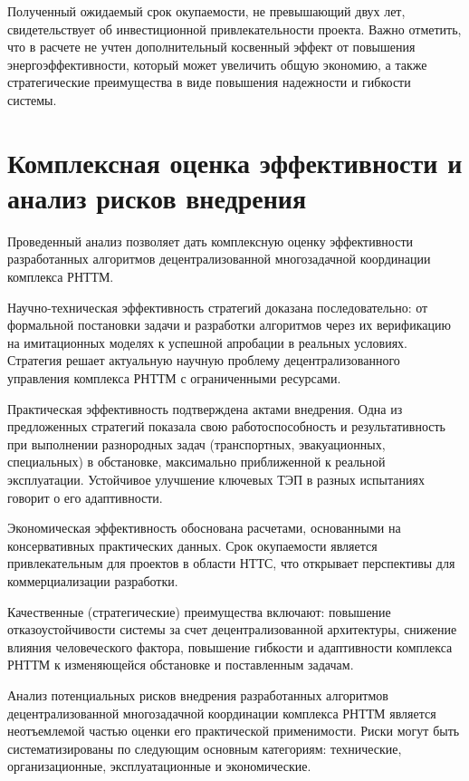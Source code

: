 Полученный ожидаемый срок окупаемости, не превышающий двух лет, свидетельствует об инвестиционной привлекательности проекта. Важно отметить, что в расчете не учтен дополнительный косвенный эффект от повышения энергоэффективности, который может увеличить общую экономию, а также стратегические преимущества в виде повышения надежности и гибкости системы.

\section{Комплексная оценка эффективности и анализ рисков внедрения}
\label{sec:ch4/sec3}

Проведенный анализ позволяет дать комплексную оценку эффективности разработанных алгоритмов децентрализованной многозадачной координации комплекса РНТТМ.

Научно-техническая эффективность стратегий доказана последовательно: от формальной постановки задачи и разработки алгоритмов через их верификацию на имитационных моделях к успешной апробации в реальных условиях. Стратегия решает актуальную научную проблему децентрализованного управления комплекса РНТТМ с ограниченными ресурсами.

Практическая эффективность подтверждена актами внедрения. Одна из предложенных стратегий показала свою работоспособность и результативность при выполнении разнородных задач (транспортных, эвакуационных, специальных) в обстановке, максимально приближенной к реальной эксплуатации. Устойчивое улучшение ключевых ТЭП в разных испытаниях говорит о его адаптивности.

Экономическая эффективность обоснована расчетами, основанными на консервативных практических данных. Срок окупаемости является привлекательным для проектов в области НТТС, что открывает перспективы для коммерциализации разработки.

Качественные (стратегические) преимущества включают: повышение отказоустойчивости системы за счет децентрализованной архитектуры, снижение влияния человеческого фактора, повышение гибкости и адаптивности комплекса РНТТМ к изменяющейся обстановке и поставленным задачам.

Анализ потенциальных рисков внедрения разработанных алгоритмов децентрализованной многозадачной координации комплекса РНТТМ является неотъемлемой частью оценки его практической применимости. Риски могут быть систематизированы по следующим основным категориям: технические, организационные, эксплуатационные и экономические.

